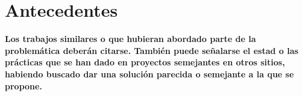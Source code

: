\section{Antecedentes}\label{sc:Antec}

\textbf{Los trabajos similares o que hubieran abordado parte de la problemática deberán citarse. También puede señalarse el estad o las prácticas que se han dado en proyectos semejantes en otros sitios, habiendo buscado dar una solución parecida o semejante a la que se propone.}